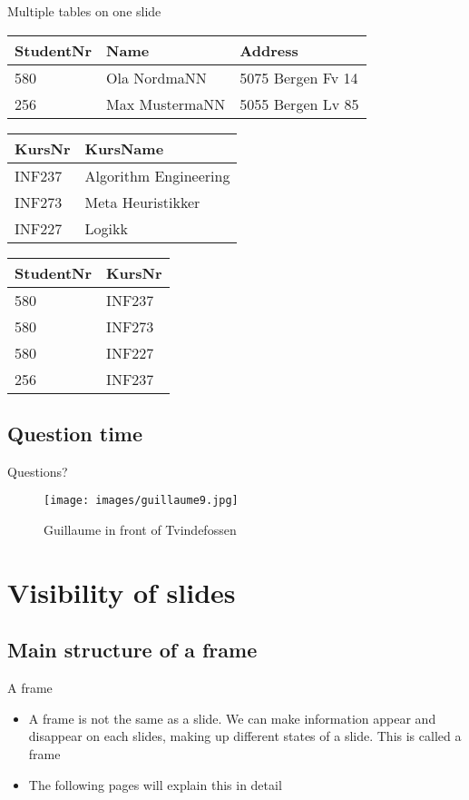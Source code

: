 \begin{frame}{Multiple tables on one slide}
\begin{tabular}{l|l|l}
 StudentNr & Name & Address\\\hline
 580 & Ola NordmaNN & 5075 Bergen Fv 14\\
 256 & Max MustermaNN & 5055 Bergen Lv 85\\
\end{tabular}
\vfill
\begin{tabular}{l|l}
KursNr & KursName \\\hline
INF237 & Algorithm Engineering\\
INF273 & Meta Heuristikker\\
INF227 & Logikk\\
\end{tabular}
\hfill
\begin{tabular}{l|l}
 StudentNr & KursNr\\\hline
 580 & INF237\\
 580 & INF273\\
 580 & INF227\\
 256 & INF237\\
\end{tabular}
\end{frame}

\subsection*{Question time}
\begin{frame}{Questions?}
    \begin{figure}
        \centering
        \texttt{[image: images/guillaume9.jpg]}
        \caption{Guillaume in front of Tvindefossen}
        \label{fig:guillaume9}
    \end{figure}
\end{frame}

\section{Visibility of slides}
\subsection*{Main structure of a frame}
\begin{frame}{A frame}
\begin{itemize}
    \item A frame is not the same as a slide. We can make information appear and disappear on each slides, making up different states of a slide. This is called a frame
    \item The following pages will explain this in detail
\end{itemize}
\end{frame}

